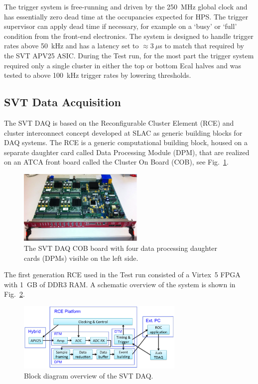 \documentclass[final,3p,times,twocolumn]{elsarticle}
\begin{document}
The trigger system is free-running and driven by the 250~MHz global clock and has essentially zero 
dead time at the occupancies expected for HPS. The trigger supervisor can apply dead time if 
necessary, for example on a `busy' or `full' condition from the front-end electronics. The system is 
designed to handle trigger rates above 50~kHz and has a latency set to $\approx 3~\mu$s to match 
that required by the SVT APV25 ASIC. During the Test run, for the most part the trigger system 
required only a single cluster in either the top or bottom Ecal halves and was tested to above 100~kHz 
trigger rates by lowering thresholds. 



\subsection{SVT Data Acquisition}
\label{sec:svt_daq}
The SVT DAQ is based on the Reconfigurable Cluster Element (RCE) and cluster 
interconnect concept developed at SLAC as generic building blocks for DAQ systems. 
The RCE is a generic computational building block, housed on a separate daughter card called 
Data Processing Module (DPM), that are realized on an ATCA front board called the Cluster On Board 
(COB), see Fig.~\ref{fig:cob}.
 \begin{figure}[]
\begin{center}
{\small
	\includegraphics[width=6cm]{figures/svt_daq_module}
	\caption{The SVT DAQ COB board with four data processing daughter cards (DPMs) visible on the left side.}
	\label{fig:cob}
}
\end{center}
\end{figure}
The first generation RCE used in the Test run consisted of a Virtex~5 FPGA with 1~GB of DDR3 RAM. 
A schematic overview of the system is shown in Fig.~\ref{fig:svtdaq}. 
 \begin{figure}[]
\begin{center}
{\small
	\includegraphics[width=8cm]{figures/svt-daq-sketch}
	\caption{Block diagram overview of the SVT DAQ.}
	\label{fig:svtdaq}
}
\end{center}
\end{figure}
\end{document}
